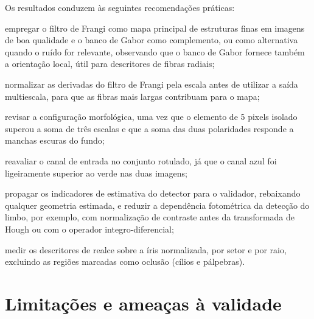 \documentclass[12pt, oneside, a4paper, chapter=TITLE, section=TITLE,
               english, brazil]{abntex2}
\newcommand{\secao}[1]{\section[\texorpdfstring{\protect\MakeTextUppercase{#1}}{#1}]{#1}}
\begin{document}
Os resultados conduzem às seguintes recomendações práticas:
\begin{alineas}
  \item empregar o filtro de Frangi como mapa principal de estruturas finas
  em imagens de boa qualidade e o banco de Gabor como complemento, ou como
  alternativa quando o ruído for relevante, observando que o banco de Gabor
  fornece também a orientação local, útil para descritores de fibras radiais;
  \item normalizar as derivadas do filtro de Frangi pela escala antes de
  utilizar a saída multiescala, para que as fibras mais largas contribuam
  para o mapa;
  \item revisar a configuração morfológica, uma vez que o elemento de 5
  pixels isolado superou a soma de três escalas e que a soma das duas
  polaridades responde a manchas escuras do fundo;
  \item reavaliar o canal de entrada no conjunto rotulado, já que o canal
  azul foi ligeiramente superior ao verde nas duas imagens;
  \item propagar os indicadores de estimativa do detector para o validador,
  rebaixando qualquer geometria estimada, e reduzir a dependência
  fotométrica da detecção do limbo, por exemplo, com normalização de
  contraste antes da transformada de Hough ou com o operador
  integro-diferencial;
  \item medir os descritores de realce sobre a íris normalizada, por setor e
  por raio, excluindo as regiões marcadas como oclusão (cílios e pálpebras).
\end{alineas}

\secao{Limitações e ameaças à validade}
\label{sec:limitacoes}
\end{document}

